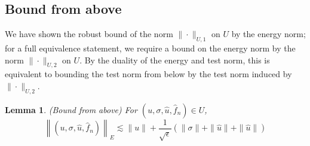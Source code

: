 \documentclass[11pt,onecolumn]{scrartcl}
\newtheorem{lemma}{Lemma}
\begin{document}
\subsection{Bound from above}

We have shown the robust bound of the norm $\|\cdot \|_{U,1}$ on $U$ by the energy norm; for a full equivalence statement, we require a bound on the energy norm by the norm $\|\cdot \|_{U,2}$ on $U$.  By the duality of the energy and test norm, this is equivalent to bounding the test norm from below by the test norm induced by $\|\cdot \|_{U,2}$.
\begin{lemma}

(Bound from above) For $\left(u,\sigma,\widehat{u},\widehat{f}_n\right) \in U$,
\[
\left\|\left(u,\sigma,\widehat{u},\widehat{f}_n\right)\right\|_E \lesssim \|u\| + \frac{1}{\sqrt{\epsilon}}\left(\|\sigma\| + \|\widehat{u}\|+ \|\widehat{u}\|\right)
\]

\end{lemma}
\end{document}
